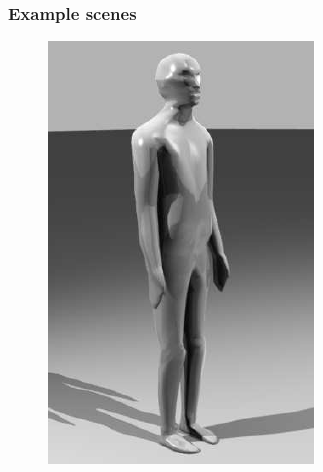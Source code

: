 \subsubsection{Example scenes}
\begin{figure}
\centerline{
    \hspace{1.3cm}
    \includegraphics{figures/alfred-rendered}
}
\end{figure}
